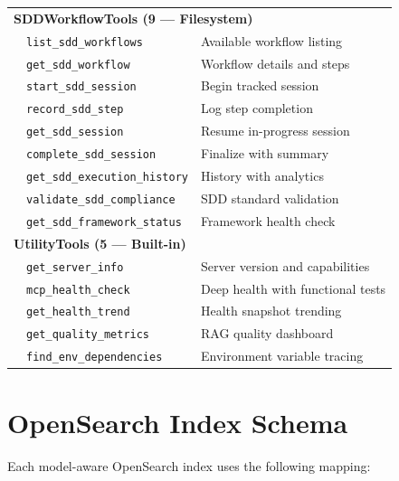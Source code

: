 \documentclass[11pt,letterpaper]{article}
\begin{document}
\begin{longtable}{@{}llp{5.5cm}@{}}
\multicolumn{3}{l}{\textbf{SDDWorkflowTools (9 --- Filesystem)}} \\
& \texttt{list\_sdd\_workflows} & Available workflow listing \\
& \texttt{get\_sdd\_workflow} & Workflow details and steps \\
& \texttt{start\_sdd\_session} & Begin tracked session \\
& \texttt{record\_sdd\_step} & Log step completion \\
& \texttt{get\_sdd\_session} & Resume in-progress session \\
& \texttt{complete\_sdd\_session} & Finalize with summary \\
& \texttt{get\_sdd\_execution\_history} & History with analytics \\
& \texttt{validate\_sdd\_compliance} & SDD standard validation \\
& \texttt{get\_sdd\_framework\_status} & Framework health check \\
\midrule

\multicolumn{3}{l}{\textbf{UtilityTools (5 --- Built-in)}} \\
& \texttt{get\_server\_info} & Server version and capabilities \\
& \texttt{mcp\_health\_check} & Deep health with functional tests \\
& \texttt{get\_health\_trend} & Health snapshot trending \\
& \texttt{get\_quality\_metrics} & RAG quality dashboard \\
& \texttt{find\_env\_dependencies} & Environment variable tracing \\

\end{longtable}

\section{OpenSearch Index Schema}
\label{app:opensearch-schema}

Each model-aware OpenSearch index uses the following mapping:
\end{document}
